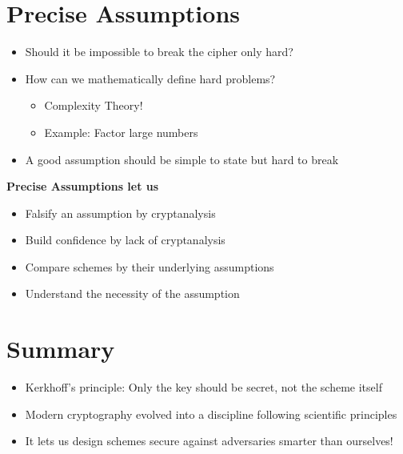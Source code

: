 	\section{Precise Assumptions}
		\begin{itemize}
			\item Should it be impossible to break the cipher only hard?
			\item How can we mathematically define hard problems?
			\begin{itemize}
				\item Complexity Theory!
				\item Example: Factor large numbers
			\end{itemize}
			\item A good assumption should be simple to state but hard to break
		\end{itemize}
		\textbf{Precise Assumptions let us}
		\begin{itemize}
			\item Falsify an assumption by cryptanalysis
			\item Build confidence by lack of cryptanalysis
			\item Compare schemes by their underlying assumptions
			\item Understand the necessity of the assumption
		\end{itemize}
	
	\section{Summary}
		\begin{itemize}
			\item Kerkhoff’s principle: Only the key should be secret, not the scheme itself
			\item Modern cryptography evolved into a discipline following scientific principles
			\item It lets us design schemes secure against adversaries smarter than ourselves!
		\end{itemize}

















